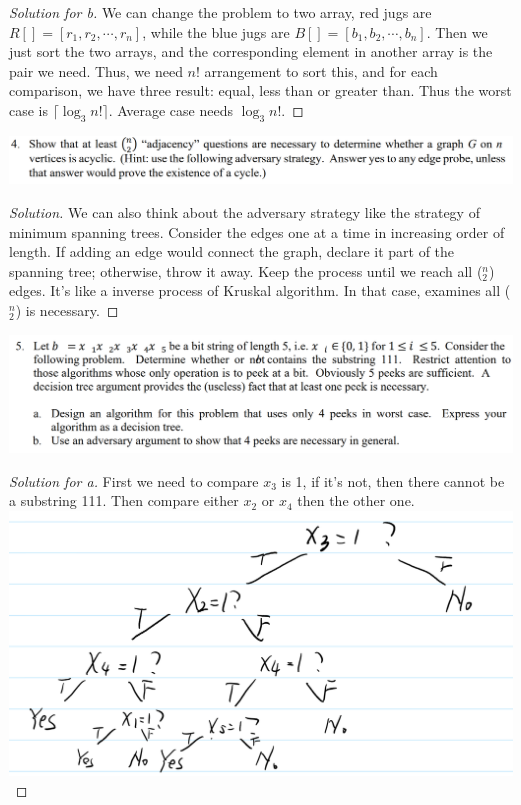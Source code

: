 \documentclass[12pt]{article}
\begin{document}
\begin{proof}[Solution for b]
	We can change the problem to two array, red jugs are $R[] = [r_1,r_2,\cdots,r_n]$, while the blue jugs are $B[] = [b_1,b_2,\cdots,b_n]$. Then we just sort the two arrays, and the corresponding element in another array is the pair we need. Thus, we need $n!$ arrangement to sort this, and for each comparison, we have three result: equal, less than or greater than. Thus the worst case is $\lceil\log_{3}{n!}\rceil$. Average case needs $\log_{3}{n!}$.
\end{proof}
\includegraphics[scale=0.22]{4.png}
\begin{proof}[Solution]
	We can also think about the adversary strategy like the strategy of minimum spanning trees.\cite{ch} Consider the edges one at a time in increasing order of length. If adding an edge would connect the graph, declare it part of the spanning tree; otherwise, throw it away. Keep the process until we reach all ($^n_2$) edges. It's like a inverse process of Kruskal algorithm. In that case, examines all ($^n_2$) is necessary.
\end{proof}
\includegraphics[scale=0.22]{5.png}
\begin{proof}[Solution for a]
	First we need to compare $x_3$ is 1, if it's not, then there cannot be a substring 111. Then compare either $x_2$ or $x_4$ then the other one.\\
	\includegraphics[scale=0.18]{5_a.png}
\end{proof}
\end{document}
